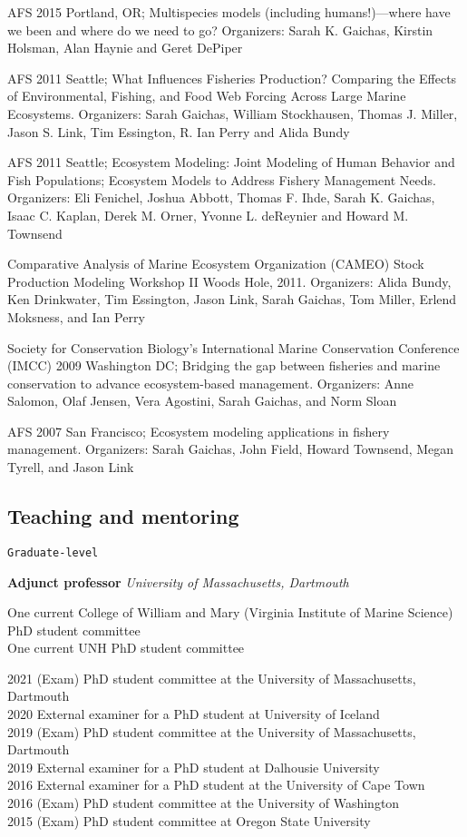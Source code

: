 \documentclass[11pt, a4paper]{awesome-cv}
\begin{document}
AFS 2015 Portland, OR; Multispecies models (including humans!)---where
have we been and where do we need to go? Organizers: Sarah K. Gaichas,
Kirstin Holsman, Alan Haynie and Geret DePiper

AFS 2011 Seattle; What Influences Fisheries Production? Comparing the
Effects of Environmental, Fishing, and Food Web Forcing Across Large
Marine Ecosystems. Organizers: Sarah Gaichas, William Stockhausen,
Thomas J. Miller, Jason S. Link, Tim Essington, R. Ian Perry and Alida
Bundy

AFS 2011 Seattle; Ecosystem Modeling: Joint Modeling of Human Behavior
and Fish Populations; Ecosystem Models to Address Fishery Management
Needs. Organizers: Eli Fenichel, Joshua Abbott, Thomas F. Ihde, Sarah K.
Gaichas, Isaac C. Kaplan, Derek M. Orner, Yvonne L. deReynier and Howard
M. Townsend

Comparative Analysis of Marine Ecosystem Organization (CAMEO) Stock
Production Modeling Workshop II Woods Hole, 2011. Organizers: Alida
Bundy, Ken Drinkwater, Tim Essington, Jason Link, Sarah Gaichas, Tom
Miller, Erlend Moksness, and Ian Perry

Society for Conservation Biology's International Marine Conservation
Conference (IMCC) 2009 Washington DC; Bridging the gap between fisheries
and marine conservation to advance ecosystem-based management.
Organizers: Anne Salomon, Olaf Jensen, Vera Agostini, Sarah Gaichas, and
Norm Sloan

AFS 2007 San Francisco; Ecosystem modeling applications in fishery
management. Organizers: Sarah Gaichas, John Field, Howard Townsend,
Megan Tyrell, and Jason Link

\hypertarget{teaching-and-mentoring}{%
\subsection{Teaching and mentoring}\label{teaching-and-mentoring}}

\begin{verbatim}
Graduate-level
\end{verbatim}

\textbf{Adjunct professor} \emph{University of Massachusetts, Dartmouth}

One current College of William and Mary (Virginia Institute of Marine
Science) PhD student committee\\
One current UNH PhD student committee

2021 (Exam) PhD student committee at the University of Massachusetts,
Dartmouth\\
2020 External examiner for a PhD student at University of Iceland\\
2019 (Exam) PhD student committee at the University of Massachusetts,
Dartmouth\\
2019 External examiner for a PhD student at Dalhousie University\\
2016 External examiner for a PhD student at the University of Cape
Town\\
2016 (Exam) PhD student committee at the University of Washington\\
2015 (Exam) PhD student committee at Oregon State University
\end{document}
